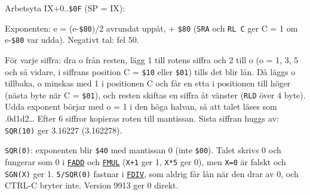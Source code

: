 \begin{Listing}
\Gap
{}
\begin{Note}\par\noindent Arbetsyta IX+0..\texttt{\$0F} (SP = IX):\par
\begin{Verb}
\end{Verb}
\par\noindent Exponenten: e = (e-\texttt{\$80})/2 avrundat uppåt, + \texttt{\$80} (\texttt{SRA} och \texttt{RL C} ger C = 1 om e-\texttt{\$80} var udda). Negativt tal: fel 50.\par
\par\noindent För varje siffra: dra o från resten, lägg 1 till rotens siffra och 2 till o (o = 1, 3, 5 och så vidare, i siffrans position C = \texttt{\$10} eller \texttt{\$01}) tills det blir lån. Då läggs o tillbaka, o minskas med 1 i positionen C och får en etta i positionen till höger (nästa byte när C = \texttt{\$01}), och resten skiftas en siffra åt vänster (\texttt{RLD} över 4 byte). Udda exponent börjar med o = 1 i den höga halvan, så att talet läses som .0d1d2… Efter 6 siffror kopieras roten till mantissan. Sista siffran huggs av: \texttt{SQR(10)} ger 3.16227 (3.162278).\par
\par\noindent \texttt{SQR(0)}: exponenten blir \texttt{\$40} med mantissan 0 (inte \texttt{\$00}). Talet skrivs 0 och fungerar som 0 i \hyperlink{l:FADD}{\texttt{FADD}} och \hyperlink{l:FMUL}{\texttt{FMUL}} (\texttt{X+1} ger 1, \texttt{X*5} ger 0), men \texttt{X=0} är falskt och \texttt{SGN(X)} ger 1. \texttt{5/SQR(0)} fastnar i \hyperlink{l:FDIV}{\texttt{FDIV}}, som aldrig får lån när den drar av 0, och CTRL-C bryter inte. Version 9913 ger 0 direkt.\par\end{Note}

\end{Listing}
